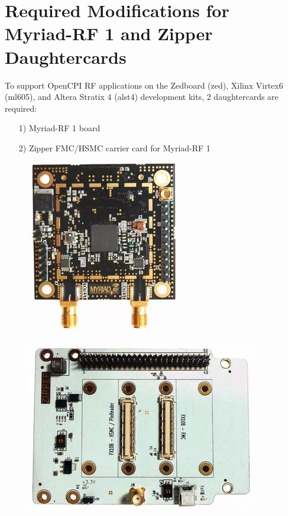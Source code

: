 \documentclass{article}
\begin{document}
\section*{Required Modifications for Myriad-RF 1 and Zipper Daughtercards}
To support OpenCPI RF applications on the Zedboard (zed), Xilinx Virtex6 (ml605), and Altera Stratix 4 (alst4) development kits, 2 daughtercards are required:\par
	\begin{itemize}
	\item[1)] Myriad-RF 1 board
	\item[2)] Zipper FMC/HSMC carrier card for Myriad-RF 1
	\end{itemize}
	\begin{figure}[ht]
	\centering
		\begin{minipage}{.5\textwidth}
			\centering\includegraphics[width=0.65\linewidth]{myriadrf}
			\label{fig:myriadrf}
		\end{minipage}%
		\begin{minipage}{.5\textwidth}
			\centering\includegraphics[width=1.0\linewidth]{zipper}
			\label{fig:zipper}
		\end{minipage}
	\end{figure}
\end{document}
